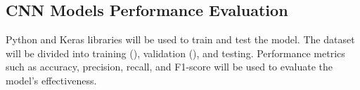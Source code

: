 \subsection{CNN Models Performance Evaluation}
Python and Keras libraries will be used to train and test the model. The dataset will be divided into training (), validation (), and testing. Performance metrics such as accuracy, precision, recall, and F1-score will be used to evaluate the model's effectiveness.